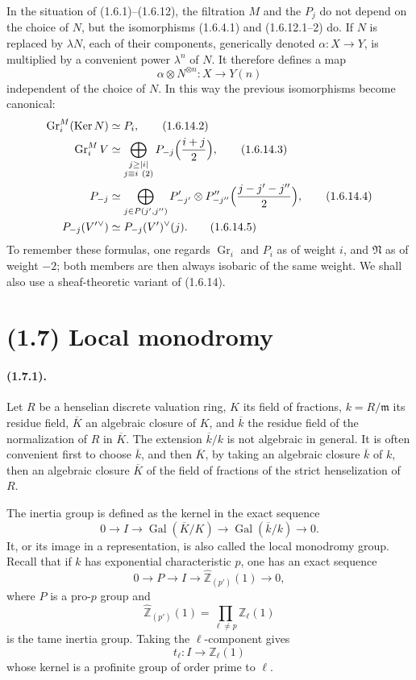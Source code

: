 \documentclass[11pt]{article}
\theoremstyle{remark}
\newcommand{\ZZ}{\mathbb{Z}}
\newcommand{\Gr}{\operatorname{Gr}}
\newcommand{\Gal}{\operatorname{Gal}}
\newcommand{\Ker}{\operatorname{Ker}}
\begin{document}
In the situation of (1.6.1)--(1.6.12), the filtration $M$ and the $P_j$ do not depend on the choice of $N$, but the isomorphisms (1.6.4.1) and (1.6.12.1--2) do. If $N$ is replaced by $\lambda N$, each of their components, generically denoted $\alpha:X\to Y$, is multiplied by a convenient power $\lambda^n$ of $N$. It therefore defines a map
\[
\alpha\otimes N^{\otimes n}:X\longrightarrow Y(n)
\]
independent of the choice of $N$. In this way the previous isomorphisms become canonical:
\begin{align}
\Gr^M_i(\Ker N)&\simeq P_i, \tag{1.6.14.2}\\
\Gr^M_i V&\simeq \bigoplus_{\substack{j\ge |i|\\ j\equiv i\ (2)}}P_{-j}\Bigl(\frac{i+j}{2}\Bigr), \tag{1.6.14.3}\\
P_{-j}&\simeq \bigoplus_{j\in P(j',j'')}P'_{-j'}\otimes P''_{-j''}\Bigl(\frac{j-j'-j''}{2}\Bigr), \tag{1.6.14.4}\\
P_{-j}(V'{}^\vee)&\simeq P_{-j}(V')^\vee(j). \tag{1.6.14.5}
\end{align}
To remember these formulas, one regards $\Gr_i$ and $P_i$ as of weight $i$, and $\mathfrak N$ as of weight $-2$; both members are then always isobaric of the same weight. We shall also use a sheaf-theoretic variant of (1.6.14).

\section*{(1.7) Local monodromy}

\paragraph{(1.7.1).}
Let $R$ be a henselian discrete valuation ring, $K$ its field of fractions, $k=R/\mathfrak m$ its residue field, $\overline K$ an algebraic closure of $K$, and $\overline k$ the residue field of the normalization of $R$ in $\overline K$. The extension $\overline k/k$ is not algebraic in general. It is often convenient first to choose $\overline k$, and then $\overline K$, by taking an algebraic closure $\overline k$ of $k$, then an algebraic closure $\overline K$ of the field of fractions of the strict henselization of $R$.

The inertia group is defined as the kernel in the exact sequence
\begin{equation}\tag{1.7.1.1}
0\longrightarrow I\longrightarrow \Gal(\overline K/K)\longrightarrow \Gal(\overline k/k)\longrightarrow 0.
\end{equation}
It, or its image in a representation, is also called the local monodromy group. Recall that if $k$ has exponential characteristic $p$, one has an exact sequence
\[
0\longrightarrow P\longrightarrow I\longrightarrow \widehat{\ZZ}_{(p')}(1)\longrightarrow 0,
\]
where $P$ is a pro-$p$ group and
\[
\widehat{\ZZ}_{(p')}(1)=\prod_{\ell\ne p}\ZZ_\ell(1)
\]
is the tame inertia group. Taking the $\ell$-component gives
\[
t_\ell:I\longrightarrow \ZZ_\ell(1)
\]
whose kernel is a profinite group of order prime to $\ell$.
\end{document}
